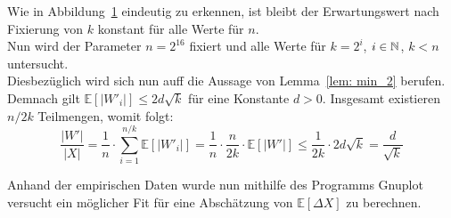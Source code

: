 \begin{figure}[H]
\begin{minipage}[t]{.30\textwidth}
        \centering
    \end{minipage}
    \label{fig: min_E_n}
\end{figure}

\noindent
Wie in Abbildung~\ref{fig: min_E_n} eindeutig zu erkennen, ist bleibt der Erwartungswert nach Fixierung von $k$ konstant für alle Werte für $n$.\\[.1cm]

\noindent
Nun wird der Parameter $n=2^{16}$ fixiert und alle Werte für $k=2^i$, $i\in\mathbb{N}$, $k<n$ untersucht.\\

\noindent
Diesbezüglich wird sich nun auff die Aussage von Lemma~\ref{lem: min_2} berufen. Demnach gilt $\mathbb{E}[|W'_i|]\leq 2d\sqrt{k}$ für eine Konstante $d>0$. Insgesamt existieren $n/2k$ Teilmengen, womit folgt:
\[
\frac{|W'|}{|X|}=\frac{1}{n}\cdot \sum\limits_{i=1}^{n/k}\mathbb{E}[|W'_i|]=\frac{1}{n}\cdot \frac{n}{2k} \cdot \mathbb{E}[|W'|]\leq\frac{1}{2k}\cdot 2d\sqrt{k}=\frac{d}{\sqrt{k}}
\]

\noindent
Anhand der empirischen Daten wurde nun  mithilfe des Programms Gnuplot~\cite{gnu} versucht ein möglicher Fit für eine Abschätzung von $\mathbb{E}[\Delta X]$ zu berechnen.

